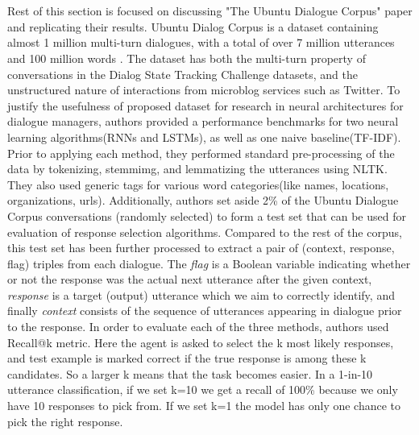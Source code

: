 \documentclass[letterpaper] {article} %
\begin{document}
\\\\
Rest of this section is focused on discussing "The Ubuntu Dialogue Corpus" paper and replicating their results. Ubuntu Dialog Corpus is a dataset containing almost 1 million multi-turn dialogues, with a total of over 7 million utterances and 100 million words \cite{lowe2015ubuntu}. The dataset has both the multi-turn property of conversations in the Dialog State Tracking Challenge datasets, and the unstructured nature of interactions from microblog services such as Twitter. To justify the usefulness of proposed dataset for research in neural architectures for dialogue managers, authors provided a performance benchmarks for two neural learning algorithms(RNNs and LSTMs), as well as one naive baseline(TF-IDF). Prior to applying each method, they performed standard pre-processing of the data by tokenizing, stemmimg, and lemmatizing the utterances using NLTK. They also used generic tags for various word categories(like names, locations, organizations, urls). Additionally, authors set aside 2\% of the Ubuntu Dialogue Corpus conversations (randomly selected) to form a test set that can be used for evaluation of response selection algorithms. Compared to the rest of the corpus, this test set has been further processed to extract a pair of (context, response, flag) triples from each dialogue. The \textit{flag} is a Boolean variable indicating whether or not the response was the actual next utterance after the given context, \textit{response} is a target (output) utterance which we aim to correctly identify, and finally \textit{context} consists of the sequence of utterances appearing in dialogue prior to the response. In order to evaluate each of the three methods, authors used Recall@k metric. Here the agent is asked to select the k most likely responses, and test example is marked correct if the true response is among these k candidates. So a larger k means that the task becomes easier. In a 1-in-10 utterance classification, if we set k=10 we get a recall of 100\% because we only have 10 responses to pick from. If we set k=1 the model has only one chance to pick the right response.
\end{document}
